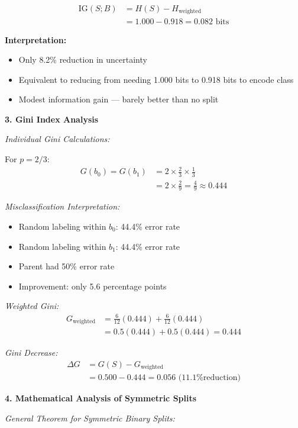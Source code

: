 \documentclass[12pt]{article}
\begin{document}
\begin{explanation}
\begin{align*}
\text{IG}(S; B) &= H(S) - H_{\text{weighted}} \\
&= 1.000 - 0.918 = 0.082 \text{ bits}
\end{align*}

\textbf{Interpretation:}
\begin{itemize}
    \item Only 8.2\% reduction in uncertainty
    \item Equivalent to reducing from needing 1.000 bits to 0.918 bits to encode class
    \item Modest information gain — barely better than no split
\end{itemize}

\textbf{3. Gini Index Analysis}

\textit{Individual Gini Calculations:}

For $p = 2/3$:
\begin{align*}
G(b_0) = G(b_1) &= 2 \times \frac{2}{3} \times \frac{1}{3} \\
&= 2 \times \frac{2}{9} = \frac{4}{9} \approx 0.444
\end{align*}

\textit{Misclassification Interpretation:}
\begin{itemize}
    \item Random labeling within $b_0$: 44.4\% error rate
    \item Random labeling within $b_1$: 44.4\% error rate
    \item Parent had 50\% error rate
    \item Improvement: only 5.6 percentage points
\end{itemize}

\textit{Weighted Gini:}
\begin{align*}
G_{\text{weighted}} &= \frac{6}{12}(0.444) + \frac{6}{12}(0.444) \\
&= 0.5(0.444) + 0.5(0.444) = 0.444
\end{align*}

\textit{Gini Decrease:}
\begin{align*}
\Delta G &= G(S) - G_{\text{weighted}} \\
&= 0.500 - 0.444 = 0.056 \text{ (11.1\% reduction)}
\end{align*}

\textbf{4. Mathematical Analysis of Symmetric Splits}

\textit{General Theorem for Symmetric Binary Splits:}


\end{explanation}
\end{document}
